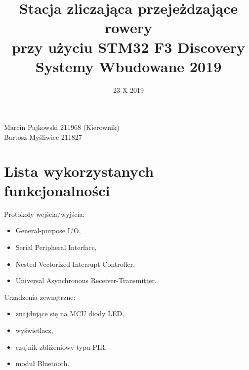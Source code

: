 \documentclass{article}
\title{Stacja zliczająca przejeżdzające rowery \\ przy użyciu STM32 F3 Discovery \\ Systemy Wbudowane 2019} %
\date{23 X 2019} %
\begin{document}
\maketitle %

\begin{center}
Marcin Pajkowski 211968 (Kierownik)\\ %
Bartosz Myśliwiec 211827 \\
\end{center}



\section{Lista wykorzystanych funkcjonalności}

Protokoły wejścia/wyjścia:
\begin{itemize}
    \item General-purpose I/O,
    \item Serial Peripheral Interface,
    \item Nested Vectorized Interrupt Controller,
    \item Universal Asynchronous Receiver-Transmitter.
\end{itemize}

Urządzenia zewnętrzne:
\begin{itemize}
    \item znajdujące się na MCU diody LED,
    \item wyświetlacz,
    \item czujnik zbliżeniowy typu PIR,
    \item moduł Bluetooth.
\end{itemize}

 
\end{document}
